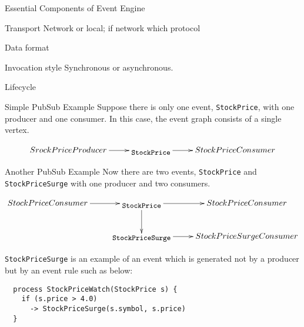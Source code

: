 \documentclass[10pt]{beamer}
\begin{document}
\begin{frame}{Essential Components of Event Engine}
\begin{block}{Transport}
Network or local; if network which protocol
\end{block}

\begin{block}{Data format}
\end{block}

\begin{block}{Invocation style}
Synchronous or asynchronous.
\end{block}

\begin{block}{Lifecycle}
\end{block}


\end{frame}


\begin{frame}{Simple PubSub Example}
Suppose there is only one event, {\tt StockPrice}, with one producer and one
consumer. In this case, the event graph consists of a single vertex.

{\small
\[\xymatrix {
  SrockPriceProducer \ar[r] & \txt{\small\tt{StockPrice}} \ar[r] & StockPriceConsumer
}
\]
}
\end{frame}

\begin{frame}[fragile]{Another PubSub Example}
Now there are two events, {\tt StockPrice} and {\tt StockPriceSurge} with one
producer and two consumers. 

{\small
\[\xymatrix {
  StockPriceConsumer \ar[r] & \txt{\small\tt{StockPrice}} \ar[r] \ar[d] & 
  StockPriceConsumer \\
   & \txt{\small\tt{StockPriceSurge}} \ar[r] & StockPriceSurgeConsumer
}
\]
}

{\tt StockPriceSurge} is an example of an event which is generated not by
a producer but by an event rule such as below:

{\small
\begin{verbatim}
  process StockPriceWatch(StockPrice s) {
    if (s.price > 4.0) 
      -> StockPriceSurge(s.symbol, s.price)
  }
\end{verbatim}
}
\end{frame}
\end{document}
